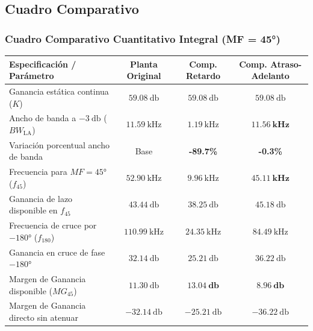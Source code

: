 \documentclass[aspectratio=169, 10pt]{beamer}
\begin{document}
\subsection{Cuadro Comparativo}
\begin{frame}
  \frametitle{Cuadro Comparativo Cuantitativo Integral (MF = 45°)}

  \begin{tarjeta}
    \centering
    \setlength{\tabcolsep}{3.2pt}
    \renewcommand{\arraystretch}{1.08}
    {\fontsize{7.2pt}{9.0pt}\selectfont
    \begin{tabular}{lccc}
      \toprule
      \textbf{Especificación / Parámetro} & \textbf{Planta Original} & \textbf{Comp. Retardo} & \textbf{Comp. Atraso-Adelanto} \\
      \midrule
      Ganancia estática continua ($K$) & $\qty{59.08}{\decibel}$ & $\qty{59.08}{\decibel}$ & $\qty{59.08}{\decibel}$ \\
      Ancho de banda a $\qty{-3}{\decibel}$ ($BW_{\text{LA}}$) & $\qty{11.59}{\kilo\hertz}$ & $\qty{1.19}{\kilo\hertz}$ & $\mathbf{\qty{11.56}{\kilo\hertz}}$ \\
      Variación porcentual ancho de banda & Base & \textbf{-89.7\%} & \textbf{-0.3\%} \\
      Frecuencia para $MF = \ang{45}$ ($f_{45}$) & $\qty{52.90}{\kilo\hertz}$ & $\qty{9.96}{\kilo\hertz}$ & $\mathbf{\qty{45.11}{\kilo\hertz}}$ \\
      Ganancia de lazo disponible en $f_{45}$ & $\qty{43.44}{\decibel}$ & $\qty{38.25}{\decibel}$ & $\qty{45.18}{\decibel}$ \\
      Frecuencia de cruce por $\ang{-180}$ ($f_{180}$) & $\qty{110.99}{\kilo\hertz}$ & $\qty{24.35}{\kilo\hertz}$ & $\qty{84.49}{\kilo\hertz}$ \\
      Ganancia en cruce de fase $\ang{-180}$ & $\qty{32.14}{\decibel}$ & $\qty{25.21}{\decibel}$ & $\qty{36.22}{\decibel}$ \\
      Margen de Ganancia disponible ($MG_{45}$) & $\qty{11.30}{\decibel}$ & $\mathbf{\qty{13.04}{\decibel}}$ & $\mathbf{\qty{8.96}{\decibel}}$ \\
      Margen de Ganancia directo sin atenuar & $\qty{-32.14}{\decibel}$ & $\qty{-25.21}{\decibel}$ & $\qty{-36.22}{\decibel}$ \\
      \bottomrule
    \end{tabular}
    }
  \end{tarjeta}
\end{frame}

\end{document}
